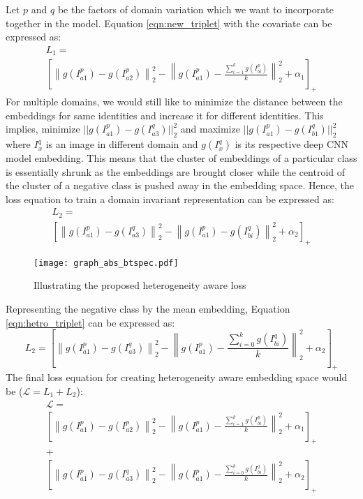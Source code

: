 \documentclass[10pt,twocolumn,letterpaper]{article}
\begin{document}
Let $p$ and $q$ be the factors of domain variation which we want to incorporate together in the model. Equation \ref{eqn:new_triplet} with the covariate can be expressed as:
\vspace{-15pt}
\begin{multline}
  \label{eqn:cov_new_triplet}
	L_{1} = \\
    \left [\left \| g(I_{a1}^p) - g(I_{a2}^p) \right \|^2_2 - \left \| g(I_{a1}^p) - \frac{\sum_{i=1}^kg(I_{bi}^p)}{k} \right \|^2_2   + \alpha_1 \right]_+
\end{multline}
For multiple domains, we would still like to minimize the distance between the embeddings for same identities and increase it for different identities. This implies, minimize $|| g(I_{a1}^p) - g(I_{a3}^q) ||_2^2$ and maximize $|| g(I_{a1}^p) - g(I_{b1}^q) ||_2^2 $ where $I_x^q$ is an image in different domain and $g(I_x^q)$ is its respective deep CNN model embedding. This means that the cluster of embeddings of a particular class is essentially shrunk as the embeddings are brought closer while the centroid of the cluster of a negative class is pushed away in the embedding space. Hence, the loss equation to train a domain invariant representation can be expressed as:
\begin{multline}
  \label{eqn:hetro_triplet}
	L_{2} = \\
    \left [\left \| g(I_{a1}^p) - g(I_{a3}^q) \right \|^2_2 - \left \| g(I_{a1}^p) - g(I_{bi}^q) \right \|^2_2   + \alpha_2 \right]_+
\end{multline}
\begin{figure}[t!]
  \centering
  \texttt{[image: graph\_abs\_btspec.pdf]}
    \vspace{-8pt}
  \caption{Illustrating the proposed heterogeneity aware loss}
    \vspace{-8pt}
  \label{fig:hetero_loss}
\end{figure}
Representing the negative class by the mean embedding, Equation \ref{eqn:hetro_triplet} can be expressed as:
\begin{equation}
  \label{eqn:cov_hetro_triplet}
	L_{2} =  \left [\left \| g(I_{a1}^p) - g(I_{a3}^q) \right \|^2_2 - \left \| g(I_{a1}^p) - \frac{\sum_{i=0}^kg(I_{bi}^q)}{k}  \right \|^2_2   + \alpha_2 \right]_+
\end{equation}
The final loss equation for creating heterogeneity aware embedding space would be ($\mathcal{L} = L_{1} + L_{2} $):
\vspace{-20pt}
\begin{multline}
	\label{eqn:final_x_loss}
    \mathcal{L} = \\
    \left[ \left \| g(I_{a1}^p) - g(I_{a2}^p) \right \|^2_2 - \left \| g(I_{a1}^p) - \frac{\sum_{i=1}^kg(I_{bi}^p)}{k} \right \|^2_2   + \alpha_1 \right]_+ \\ 
    + \\
    \left[ \left \| g(I_{a1}^p) - g(I_{a3}^q) \right \|^2_2 - \left \| g(I_{a1}^p) - \frac{\sum_{i=0}^kg(I_{bi}^q)}{k}  \right \|^2_2   + \alpha_2 \right]_+
\end{multline}
\end{document}
